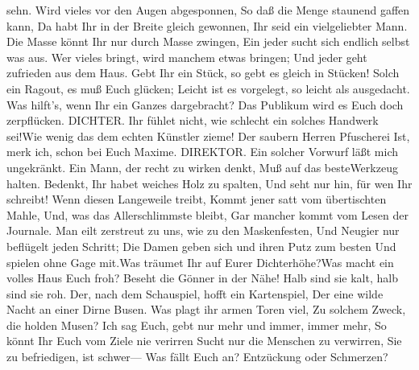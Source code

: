 sehn. Wird vieles vor den Augen abgesponnen, So daß die Menge staunend gaffen kann,
Da habt Ihr in der Breite gleich gewonnen, Ihr seid ein vielgeliebter Mann. Die Masse könnt
Ihr nur durch Masse zwingen, Ein jeder sucht sich endlich selbst was aus. Wer vieles bringt,
wird manchem etwas bringen; Und jeder geht zufrieden aus dem Haus. Gebt Ihr ein Stück,
so gebt es gleich in Stücken! Solch ein Ragout, es muß Euch glücken; Leicht ist es vorgelegt,
so leicht als ausgedacht. Was hilft’s, wenn Ihr ein Ganzes dargebracht? Das Publikum wird es
Euch doch zerpflücken.
DICHTER. Ihr fühlet nicht, wie schlecht ein solches Handwerk sei!Wie wenig das dem echten
Künstler zieme! Der saubern Herren Pfuscherei Ist, merk ich, schon bei Euch Maxime.
DIREKTOR. Ein solcher Vorwurf läßt mich ungekränkt. Ein Mann, der recht zu wirken denkt,
Muß auf das besteWerkzeug halten. Bedenkt, Ihr habet weiches Holz zu spalten, Und seht nur
hin, für wen Ihr schreibt! Wenn diesen Langeweile treibt, Kommt jener satt vom übertischten
Mahle, Und, was das Allerschlimmste bleibt, Gar mancher kommt vom Lesen der Journale.
Man eilt zerstreut zu uns, wie zu den Maskenfesten, Und Neugier nur beflügelt jeden Schritt;
Die Damen geben sich und ihren Putz zum besten Und spielen ohne Gage mit.Was träumet Ihr
auf Eurer Dichterhöhe?Was macht ein volles Haus Euch froh? Beseht die Gönner in der Nähe!
Halb sind sie kalt, halb sind sie roh. Der, nach dem Schauspiel, hofft ein Kartenspiel, Der eine
wilde Nacht an einer Dirne Busen. Was plagt ihr armen Toren viel, Zu solchem Zweck, die
holden Musen? Ich sag Euch, gebt nur mehr und immer, immer mehr, So könnt Ihr Euch vom
Ziele nie verirren Sucht nur die Menschen zu verwirren, Sie zu befriedigen, ist schwer— Was
fällt Euch an? Entzückung oder Schmerzen?
